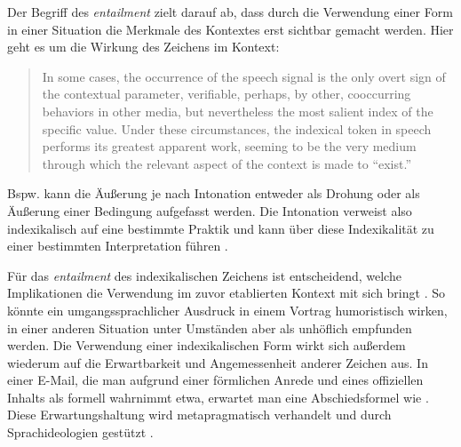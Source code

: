 Der Begriff des \textit{entailment} zielt darauf ab, dass durch die Verwendung einer  Form in einer Situation die Merkmale des Kontextes erst sichtbar gemacht werden. Hier geht es um die Wirkung des Zeichens im Kontext:

\begin{quote} In some cases, the occurrence of the speech signal is the only overt sign of the contextual parameter, verifiable, perhaps, by other, cooccurring behaviors in other media, but nevertheless the most salient index of the specific value. Under these circumstances, the indexical token in speech performs its greatest apparent work, seeming to be the very medium through which the relevant aspect of the context is made to “exist.” \citep[34]{Silverstein.1976}
\end{quote}
Bspw. kann die Äußerung  je nach Intonation entweder als Drohung oder als Äußerung einer Bedingung aufgefasst werden. 
Die Intonation verweist also indexikalisch auf eine bestimmte Praktik und kann über diese Indexikalität zu einer bestimmten Interpretation führen \citep[s.][421]{Ochs1996}. 

Für das \textit{entailment} des indexikalischen Zeichens ist entscheidend, welche Implikationen die Verwendung im zuvor etablierten Kontext mit sich bringt \citep[s.][195]{Silverstein2003}. 
So könnte ein umgangssprachlicher Ausdruck in einem Vortrag humoristisch wirken, in einer anderen Situation unter Umständen aber als unhöflich empfunden werden. 
Die Verwendung einer indexikalischen Form wirkt sich außerdem wiederum auf die Erwartbarkeit und Angemessenheit anderer Zeichen aus. 
In einer E-Mail, die man aufgrund einer förmlichen Anrede und eines offiziellen Inhalts als formell wahrnimmt etwa, erwartet man eine Abschiedsformel wie . 
Diese Erwartungshaltung wird metapragmatisch verhandelt und durch Sprachideologien gestützt \citep[s.][196]{Silverstein2003}. 

